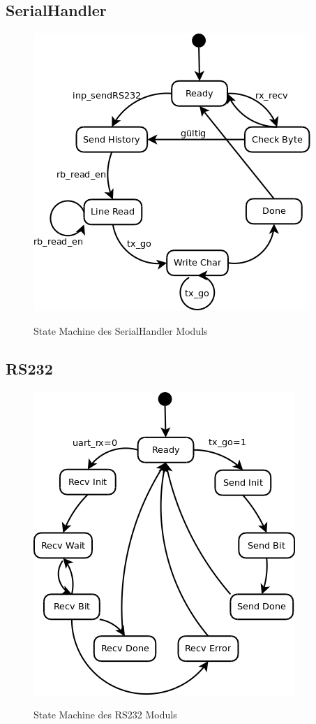 \subsection{SerialHandler}

\begin{figure}[!ht]
 \caption{State Machine des SerialHandler Moduls}
 \centering
 \includegraphics[scale=0.55]{pics/SerialHandler.png}
 \label{fig:Modules}
\end{figure}

\subsection{RS232}

\begin{figure}[!ht]
 \caption{State Machine des RS232 Moduls}
 \centering
 \includegraphics[scale=0.55]{pics/RS232.png}
 \label{fig:Modules}
\end{figure}

